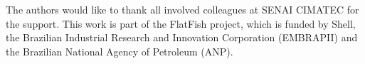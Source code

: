 \documentclass[conference, letterpaper]{IEEEtran}
\begin{document}
The authors would like to thank all involved colleagues at SENAI CIMATEC for
the support. This work is part of the FlatFish project, which is funded by
Shell, the Brazilian Industrial Research and Innovation Corporation (EMBRAPII)
and the Brazilian National Agency of Petroleum (ANP).






\end{document}
